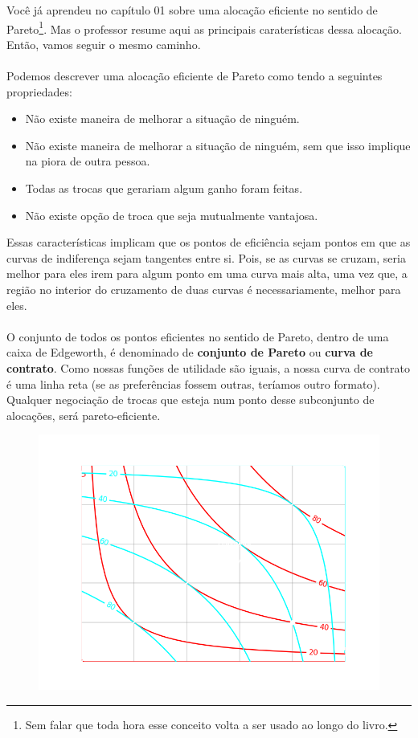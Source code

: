 \documentclass[a4paper,11pt,oneside]{book}
\theoremstyle{definition}
\theoremstyle{break}
\begin{document}
Você já aprendeu no capítulo 01 sobre uma alocação eficiente no sentido de Pareto\footnote{Sem falar que toda hora esse conceito volta a ser usado ao longo do livro.}. Mas o professor resume aqui as principais caraterísticas dessa alocação. Então, vamos seguir o mesmo caminho.
\\
\\
Podemos descrever uma alocação eficiente de Pareto como tendo a seguintes propriedades:
\begin{itemize}
\item Não existe maneira de melhorar a situação de ninguém.
\item Não existe maneira de melhorar a situação de ninguém, sem que isso implique na piora de outra pessoa.
\item Todas as trocas que gerariam algum ganho foram feitas.
\item Não existe opção de troca que seja mutualmente vantajosa.
\end{itemize}

Essas características implicam que os pontos de eficiência sejam pontos em que as curvas de indiferença sejam tangentes entre si. Pois, se as curvas se cruzam, seria melhor para eles irem para algum ponto em uma curva mais alta, uma vez que, a região no interior do cruzamento de duas curvas é necessariamente, melhor para eles.
\\
\\
O conjunto de todos os pontos eficientes no sentido de Pareto, dentro de uma caixa de Edgeworth, é denominado de \textbf{conjunto de Pareto} ou \textbf{curva de contrato}. Como nossas funções de utilidade são iguais, a nossa curva de contrato é uma linha reta (se as preferências fossem outras, teríamos outro formato). Qualquer negociação de trocas que esteja num ponto desse subconjunto de alocações, será pareto-eficiente.

\begin{figure}[H]
\centering
\includegraphics[scale=0.8]{cap32_3-caixa_edgeworth_1.png}
\end{figure}
\end{document}
